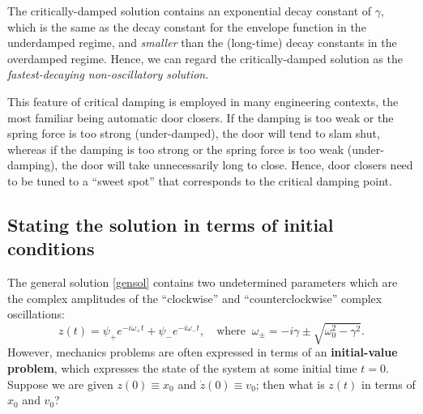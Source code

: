 \documentclass[10pt,a4paper]{article}
\begin{document}
The critically-damped solution contains an exponential decay constant
of $\gamma$, which is the same as the decay constant for the envelope
function in the underdamped regime, and \emph{smaller} than the
(long-time) decay constants in the overdamped regime. Hence, we can
regard the critically-damped solution as the \emph{fastest-decaying
  non-oscillatory solution}.

This feature of critical damping is employed in many engineering
contexts, the most familiar being automatic door closers. If the damping
is too weak or the spring force is too strong (under-damped), the door
will tend to slam shut, whereas if the damping is too strong or the
spring force is too weak (under-damping), the door will take
unnecessarily long to close. Hence, door closers need to be tuned to a
``sweet spot'' that corresponds to the critical damping point.

\subsection{Stating the solution in terms of initial conditions}
\label{stating-the-solution-in-terms-of-initial-conditions}

The general solution \eqref{gensol} contains two undetermined parameters
which are the complex amplitudes of the ``clockwise'' and
``counterclockwise'' complex oscillations:
\begin{equation}
z(t) = \psi_+ e^{-i\omega_+ t} + \psi_- e^{-i\omega_- t}, \quad\mathrm{where} \;\; \omega_\pm =  -i\gamma  \pm \sqrt{\omega_0^2 - \gamma^2}.
\end{equation}
However, mechanics problems are often expressed in terms of an
\textbf{initial-value problem}, which expresses the state of the system
at some initial time $t = 0$. Suppose we are given $z(0) \equiv x_0$
and $\dot{z}(0) \equiv v_0$; then what is $z(t)$ in terms of $x_0$
and $v_0$?
\end{document}
